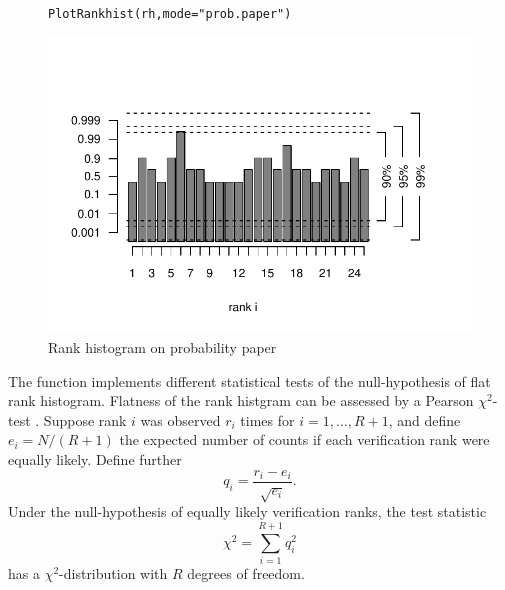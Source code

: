\documentclass[article]{jss}\usepackage[]{graphicx}\usepackage[]{color}
\makeatletter
\def\maxwidth{ %
  \ifdim\Gin@nat@width>\linewidth
    \linewidth
  \else
    \Gin@nat@width
  \fi
}
\newcommand{\hlstr}[1]{\textcolor[rgb]{0.651,0.522,0}{#1}}%
\newcommand{\hlstd}[1]{\textcolor[rgb]{0,0,0}{#1}}%
\newcommand{\hlkwc}[1]{\textcolor[rgb]{0,0.502,0.753}{#1}}%
\newcommand{\hlkwd}[1]{\textcolor[rgb]{0,0.267,0.4}{#1}}%
\newenvironment{kframe}{%
 \def\at@end@of@kframe{}%
 \ifinner\ifhmode%
  \def\at@end@of@kframe{\end{minipage}}%
  \begin{minipage}{\columnwidth}%
 \fi\fi%
 \def\FrameCommand##1{\hskip\@totalleftmargin \hskip-\fboxsep
 \colorbox{shadecolor}{##1}\hskip-\fboxsep
     \hskip-\linewidth \hskip-\@totalleftmargin \hskip\columnwidth}%
 \MakeFramed {\advance\hsize-\width
   \@totalleftmargin\z@ \linewidth\hsize
   \@setminipage}}%
 {\par\unskip\endMakeFramed%
 \at@end@of@kframe}
\newenvironment{knitrout}{}{} %
\makeatother
\begin{document}
\begin{figure}
\begin{center}
%
\begin{knitrout}
\color{fgcolor}\begin{kframe}
\begin{alltt}
\hlkwd{PlotRankhist}\hlstd{(rh,} \hlkwc{mode}\hlstd{=}\hlstr{"prob.paper"}\hlstd{)}
\end{alltt}
\end{kframe}
\includegraphics[width=\maxwidth]{figure/rank-hist-pp-1} 

\end{knitrout}
%
\end{center}
\caption{Rank histogram on probability paper}
\label{fig:rank-hist-pp}
\end{figure}


The function  implements different statistical tests of the null-hypothesis of flat rank histogram.
Flatness of the rank histgram can be assessed by a Pearson $\chi^2$-test \citep{pearson1900criterion}.
Suppose rank $i$ was observed $r_i$ times for $i=1,\dots,R+1$, and define $e_i=N/(R+1)$ the expected number of counts if each verification rank were equally likely.
Define further
\begin{equation}
q_i = \frac{r_i - e_i}{\sqrt{e_i}}.
\end{equation}
%
Under the null-hypothesis of equally likely verification ranks, the test statistic
%
\begin{equation}
\chi^2 = \sum_{i=1}^{R+1} q_i^2
\end{equation}
%
has a $\chi^2$-distribution with $R$ degrees of freedom.
\end{document}
